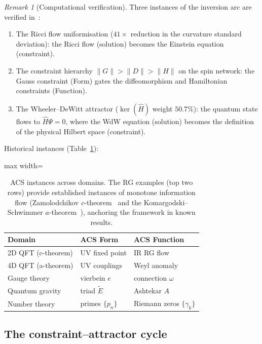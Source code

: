\documentclass[11pt,a4paper]{article}
\theoremstyle{plain}
\theoremstyle{definition}
\theoremstyle{remark}
\newtheorem{remark}[theorem]{Remark}
\begin{document}
\begin{remark}[Computational verification]
Three instances of the inversion arc are verified in~\cite{Wallace2026a}:
\begin{enumerate}[noitemsep]
  \item The Ricci flow uniformisation ($41\times$ reduction in the curvature
    standard deviation):
    the Ricci flow (solution) becomes the Einstein equation (constraint).
  \item The constraint hierarchy $\|G\| > \|D\| > \|H\|$ on the spin network:
    the Gauss constraint (Form) gates the diffeomorphism and Hamiltonian
    constraints (Function).
  \item The Wheeler--DeWitt attractor ($\ker(\hat{H})$ weight $50.7\%$):
    the quantum state flows to $\hat{H}\Psi = 0$, where the WdW equation
    (solution) becomes the definition of the physical Hilbert space
    (constraint).
\end{enumerate}
\end{remark}

\noindent
Historical instances (Table~\ref{tab:acs-instances}):

\begin{table}[h]
\centering
\begin{adjustbox}{max width=\linewidth}\begin{tabular}{lll}
\toprule
Domain & ACS Form & ACS Function \\
\midrule
2D QFT (c-theorem) & UV fixed point & IR RG flow \\
4D QFT (a-theorem) & UV couplings & Weyl anomaly \\
Gauge theory & vierbein $e$ & connection $\omega$ \\
Quantum gravity & triad $\tilde{E}$ & Ashtekar $A$ \\
Number theory & primes $\{p_n\}$ & Riemann zeros $\{\gamma_k\}$ \\
\bottomrule
\end{tabular}\end{adjustbox}
\caption{ACS instances across domains.  The RG examples (top two rows) provide
established instances of monotone information flow (Zamolodchikov $c$-theorem~\cite{Zamolodchikov1986} and the
Komargodski--Schwimmer $a$-theorem~\cite{KomargodskiSchwimmer2011}), anchoring the framework in known results.}
\label{tab:acs-instances}
\end{table}

\subsection{The constraint--attractor cycle}
\label{sec:constraint}
\end{document}
